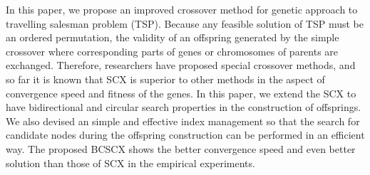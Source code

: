 In this paper, we propose an improved crossover method for genetic approach to travelling salesman problem (TSP). Because any feasible solution of TSP must be an ordered permutation, the validity of an offspring generated by the simple crossover where corresponding parts of genes or chromosomes of parents are exchanged. Therefore, researchers have proposed special crossover methods, and so far it is known that SCX is superior to other methods in the aspect of convergence speed and fitness of the genes. In this paper, we extend the SCX to have bidirectional and circular search properties in the construction of offsprings. We also devised an simple and effective index management so that the search for candidate nodes during the offspring construction can be performed in an efficient way. The proposed BCSCX shows the better convergence speed and even better solution than those of SCX in the empirical experiments.